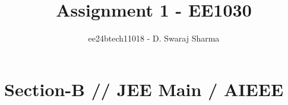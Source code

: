 \documentclass[journal]{IEEEtran}
\begin{document}

\vspace{3cm}

\title{Assignment 1 - EE1030}
\author{ee24btech11018 - D. Swaraj Sharma}
{\let\newpage\relax\maketitle}
\renewcommand{\thefigure}{\theenumi}
\renewcommand{\thetable}{\theenumi}

\section{\textbf{Section-B} // \textbf{JEE Main} / \textbf{AIEEE}}
\end{document}
